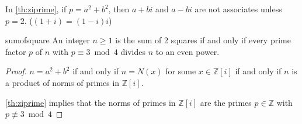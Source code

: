 \begin{remark}
    In \cref{th:ziprime}, if \(p = a^2 + b^2\), then \(a + bi\) and \(a - bi\) are not associates unless \(p = 2\). (\((1 + i) = (1-i)i\))
\end{remark}
\begin{corollary}{}{sumofsquare}
    An integer \(n \geq 1\) is the sum of 2 squares if and only if every prime factor \(p\) of \(n\) with \(p \equiv 3 \bmod 4\) divides \(n\) to an even power.
\end{corollary}
\begin{proof}
    \(n = a^2 + b^2\) if and only if \(n = N(x)\) for some \(x \in \mathbb{Z}[i]\) if and only if \(n\) is a product of norms of primes in \(\mathbb{Z}[i]\).

    \cref{th:ziprime} implies that the norms of primes in \(\mathbb{Z}[i]\) are the primes \(p \in \mathbb{Z}\) with \(p \not \equiv 3 \bmod 4\)
\end{proof}